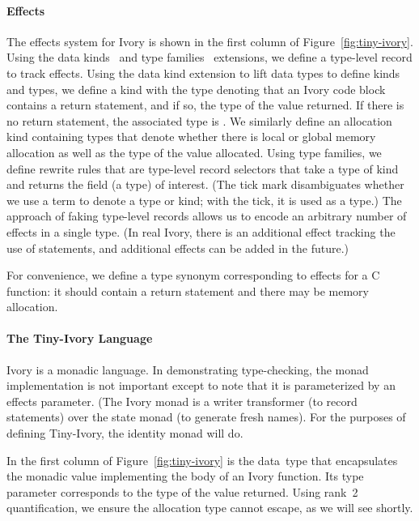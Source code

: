 \paragraph{Effects}
The effects system for Ivory is shown in the first column of
Figure~\ref{fig:tiny-ivory}.  Using the data kinds~\cite{datakinds} and type
families~\cite{typefamilies} extensions, we define a type-level record to track
effects.  Using the data kind extension to lift data types to define kinds and
types, we define a kind  with the type  denoting that an
Ivory code block contains a return statement, and if so, the type of the value
returned.  If there is no return statement, the associated type is .
We similarly define an allocation kind containing types that denote whether
there is local or global memory allocation as well as the type of the value
allocated.  Using type families, we define rewrite rules that are type-level
record selectors that take a type of kind  and returns the field (a
type) of interest.  (The tick mark disambiguates whether we use a term to denote
a type or kind; with the tick, it is used as a type.)  The approach of faking
type-level records allows us to encode an arbitrary number of effects in a
single type.  (In real Ivory, there is an additional effect tracking the use of
 statements, and additional effects can be added in the future.)

For convenience, we define a type synonym  corresponding to
effects for a C function: it should contain a return statement and there may be
memory allocation.

\paragraph{The Tiny-Ivory Language}
Ivory is a monadic language.  In demonstrating type-checking, the monad
implementation is not important except to note that it is parameterized by an
effects parameter.  (The Ivory monad is a writer transformer (to
record statements) over the state monad (to generate fresh names).  For the
purposes of defining Tiny-Ivory, the identity monad will do.

In the first column of Figure~\ref{fig:tiny-ivory} is the  data~type
that encapsulates the monadic value implementing the body of an Ivory function.
Its type parameter corresponds to the type of the value returned.  Using rank~2
quantification, we ensure the allocation type cannot escape, as we will see shortly.

